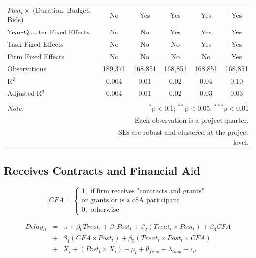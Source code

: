 \documentclass[
]{article}
\begin{document}
\begin{table}[H]
\begin{tabular}{@{\extracolsep{-2pt}}lccccc}
$Post_t \times $  (Duration, Budget, Bids) & No & Yes & Yes & Yes & Yes \\ 
Year-Quarter Fixed Effects & No & No & Yes & Yes & Yes \\ 
Task Fixed Effects & No & No & No & Yes & Yes \\ 
Firm Fixed Effects & No & No & No & No & Yes \\ 
Observations & 189,371 & 168,851 & 168,851 & 168,851 & 168,851 \\ 
R$^{2}$ & 0.004 & 0.01 & 0.02 & 0.04 & 0.10 \\ 
Adjusted R$^{2}$ & 0.004 & 0.01 & 0.02 & 0.03 & 0.03 \\ 
\hline 
\hline \\[-1.8ex] 
\textit{Note:}  & \multicolumn{5}{r}{$^{*}$p$<$0.1; $^{**}$p$<$0.05; $^{***}$p$<$0.01} \\ 
 & \multicolumn{5}{r}{Each observation is a project-quarter.} \\ 
 & \multicolumn{5}{r}{SEs are robust and clustered at the project level.} \\ 
\end{tabular} 
\end{table}

\hypertarget{receives-contracts-and-financial-aid}{%
\subsection{Receives Contracts and Financial
Aid}\label{receives-contracts-and-financial-aid}}

\[ CFA = \begin{cases} 1, \text{ if firm receives "contracts and grants"}\\ 
                       \text{or grants or is a c8A participant}\\
0, \text{ otherwise} \end{cases}\]

\[ \begin{aligned}
Delay_{it} &=& \alpha+\beta_0 Treat_i + \beta_1 Post_t + \beta_2 (Treat_i \times Post_t) +\beta_3 CFA \\
&+& \beta_4 (CFA \times Post_t) + \beta_5 (Treat_i \times Post_t \times CFA) \\ 
&+&X_i + (Post_t \times X_i) + \mu_t + \theta_{firm} + \lambda_{task}+ \epsilon_{it}
\end{aligned}\]
\end{document}
